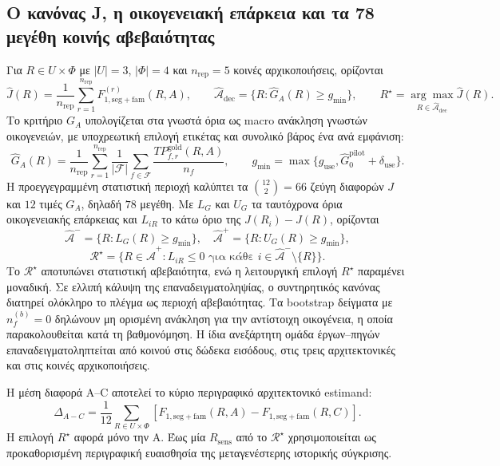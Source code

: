 \documentclass[11pt,a4paper]{article}
\begin{document}
\subsection{Ο κανόνας J, η οικογενειακή επάρκεια και τα 78 μεγέθη κοινής αβεβαιότητας}
Για $R\in U\times\Phi$ με $|U|=3$, $|\Phi|=4$ και $n_{\mathrm{rep}}=5$ κοινές αρχικοποιήσεις, ορίζονται
\[
 \widehat J(R)=\frac1{n_{\mathrm{rep}}}\sum_{r=1}^{n_{\mathrm{rep}}}
 F_{1,\mathrm{seg+fam}}^{(r)}(R,A),
 \qquad \widehat{\mathcal A}_{\mathrm{dec}}=
 \{R:\widehat G_A(R)\ge g_{\min}\},
 \qquad R^\star=\underset{R\in\widehat{\mathcal A}_{\mathrm{dec}}}{\arg\max}\widehat J(R).
\]
Το κριτήριο $G_A$ υπολογίζεται στα γνωστά όρια ως macro ανάκληση γνωστών οικογενειών, με υποχρεωτική επιλογή ετικέτας και συνολικό βάρος ένα ανά εμφάνιση:
\[
 \widehat G_A(R)=\frac1{n_{\mathrm{rep}}}
 \sum_{r=1}^{n_{\mathrm{rep}}}\frac1{|\mathcal F|}
 \sum_{f\in\mathcal F}\frac{TP^{\mathrm{gold}}_{f,r}(R,A)}{n_f},
 \qquad
 g_{\min}=\max\{g_{\mathrm{use}},\widehat G_0^{\mathrm{pilot}}+\delta_{\mathrm{use}}\}.
\]
Η προεγγεγραμμένη στατιστική περιοχή καλύπτει τα $\binom{12}{2}=66$ ζεύγη διαφορών $J$ και $12$ τιμές $G_A$, δηλαδή $78$ μεγέθη. Με $L_G$ και $U_G$ τα ταυτόχρονα όρια οικογενειακής επάρκειας και $L_{iR}$ το κάτω όριο της $J(R_i)-J(R)$, ορίζονται
\[
 \widehat{\mathcal A}^{-}=\{R:L_G(R)\ge g_{\min}\},\quad
 \widehat{\mathcal A}^{+}=\{R:U_G(R)\ge g_{\min}\},
\]
\[
 \mathcal R^\star=\{R\in\widehat{\mathcal A}^{+}:
  L_{iR}\le0\text{ για κάθε }i\in\widehat{\mathcal A}^{-}\setminus\{R\}\}.
\]
Το $\mathcal R^\star$ αποτυπώνει στατιστική αβεβαιότητα, ενώ η λειτουργική επιλογή $R^\star$ παραμένει μοναδική. Σε ελλιπή κάλυψη της επαναδειγματοληψίας, ο συντηρητικός κανόνας διατηρεί ολόκληρο το πλέγμα ως περιοχή αβεβαιότητας. Τα bootstrap δείγματα με $n_f^{(b)}=0$ δηλώνουν μη ορισμένη ανάκληση για την αντίστοιχη οικογένεια, η οποία παρακολουθείται κατά τη βαθμονόμηση. Η ίδια ανεξάρτητη ομάδα έργων--πηγών επαναδειγματοληπτείται από κοινού στις δώδεκα εισόδους, στις τρεις αρχιτεκτονικές και στις κοινές αρχικοποιήσεις.

Η μέση διαφορά A--C αποτελεί το κύριο περιγραφικό αρχιτεκτονικό estimand:
\[
 \Delta_{A-C}=\frac1{12}\sum_{R\in U\times\Phi}
 \left[F_{1,\mathrm{seg+fam}}(R,A)-F_{1,\mathrm{seg+fam}}(R,C)\right].
\]
Η επιλογή $R^\star$ αφορά μόνο την A. Έως μία $R_{\mathrm{sens}}$ από το $\mathcal R^\star$ χρησιμοποιείται ως προκαθορισμένη περιγραφική ευαισθησία της μεταγενέστερης ιστορικής σύγκρισης.
\end{document}
